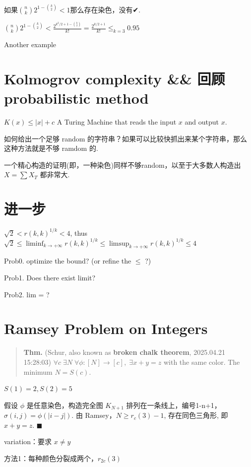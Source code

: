 如果${n\choose k}2^{1-{k\choose 2}}< 1$那么存在染色，没有✔.

${n\choose k}2^{1-{k\choose 2}}<\frac{2^{k^2/2+1-{k\choose2}}}{k!}=\frac{2^{k/2+1}}{k!}\leq_{k=3}0.95$

Another example


\section{Kolmogrov complexity \&\& 回顾 probabilistic method}

$K(x)\leq |x|+c$ A Turing Machine that reads the input $x$ and output $x$.

如何给出一个足够 random 的字符串？如果可以比较快抓出来某个字符串，那么这种方法就是不够 ramdom 的.

一个精心构造的证明(即，一种染色)同样不够random，以至于大多数人构造出 $X=\sum X_T$ 都非常大.

\section{进一步}

$\sqrt{2}<r(k,k)^{1/k}<4$, thus $\sqrt{2}\leq \liminf_{k\to+\infty}r(k,k)^{1/k}\leq\limsup_{k\to+\infty}r(k,k)^{1/k}\leq4$

Prob0. optimize the bound? (or refine the $\leq$ ?)

Prob1. Does there exist limit?

Prob2. lim = ?

\section{Ramsey Problem on Integers}

\begin{quotation}
\textbf{Thm.} (Schur, also known as \textbf{broken chalk theorem}, 2025.04.21 15:28:03) $\forall c\;\exists N \;\forall \phi:[N]\to[c],\;\exists x+y=z$ with the same color. The minimum $N=S(c)$.
\end{quotation}

$S(1)=2,S(2)=5$

假设 $\phi$ 是任意染色，构造完全图 $K_{N+1}$ 排列在一条线上，编号1-n+1，$\sigma(i,j)=\phi(|i-j|)$. 由 Ramsey，$N\geq r_c(3)-1$, 存在同色三角形, 即 $x+y=z$.  $\blacksquare$

variation：要求 $x\not=y$

方法1：每种颜色分裂成两个，$r_{2c}(3)$

